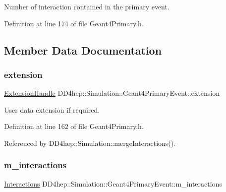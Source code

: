 Number of interaction contained in the primary event. 



Definition at line 174 of file Geant4\+Primary.\+h.



\subsection{Member Data Documentation}
\hypertarget{class_d_d4hep_1_1_simulation_1_1_geant4_primary_event_a91db5fc340c2b13402f920b62ba45eb9}{}\label{class_d_d4hep_1_1_simulation_1_1_geant4_primary_event_a91db5fc340c2b13402f920b62ba45eb9} 
\subsubsection{\texorpdfstring{extension}{extension}}
{\footnotesize\ttfamily \hyperlink{class_d_d4hep_1_1_simulation_1_1_geant4_primary_event_acfe0b3b7ad6f183fe75a6539b4470418}{Extension\+Handle} D\+D4hep\+::\+Simulation\+::\+Geant4\+Primary\+Event\+::extension}



User data extension if required. 



Definition at line 162 of file Geant4\+Primary.\+h.



Referenced by D\+D4hep\+::\+Simulation\+::merge\+Interactions().

\hypertarget{class_d_d4hep_1_1_simulation_1_1_geant4_primary_event_accff0a45f858135ce13050e2b1cdb706}{}\label{class_d_d4hep_1_1_simulation_1_1_geant4_primary_event_accff0a45f858135ce13050e2b1cdb706} 
\subsubsection{\texorpdfstring{m\+\_\+interactions}{m\_interactions}}
{\footnotesize\ttfamily \hyperlink{class_d_d4hep_1_1_simulation_1_1_geant4_primary_event_adae96b166507159c2dd92b4e20352a52}{Interactions} D\+D4hep\+::\+Simulation\+::\+Geant4\+Primary\+Event\+::m\+\_\+interactions\hspace{0.3cm}{\ttfamily [protected]}}



